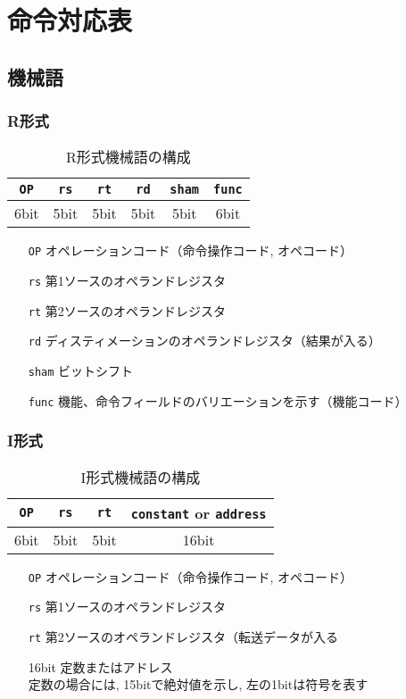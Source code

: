 \documentclass[a4paper, xelatex, ja=standard]{bxjsarticle}
\begin{document}
\maketitle
\section{命令対応表}
\subsection{機械語}
\subsubsection*{R形式}
\begin{table}[h]
  \centering
  \caption{R形式機械語の構成}
  \label{}
  \begin{tabular}{|c|c|c|c|c|c|}\hline
  \texttt{OP} & \texttt{rs} & \texttt{rt} & \texttt{rd} & \texttt{sham} & \texttt{func} \\\hline
  6bit & 5bit & 5bit & 5bit & 5bit & 6bit \\\hline
  \end{tabular}
\end{table}
\begin{enumerate}
  \item[\texttt{OP}]オペレーションコード（命令操作コード, オペコード）
  \item[\texttt{rs}]第1ソースのオペランドレジスタ
  \item[\texttt{rt}]第2ソースのオペランドレジスタ
  \item[\texttt{rd}]ディスティメーションのオペランドレジスタ（結果が入る）
  \item[\texttt{sham}]ビットシフト
  \item[\texttt{func}]機能、命令フィールドのバリエーションを示す（機能コード）
\end{enumerate}

\subsubsection*{I形式}
\begin{table}[h]
  \centering
  \caption{I形式機械語の構成}
  \label{}
  \begin{tabular}{|c|c|c|c|}\hline
  \texttt{OP} & \texttt{rs} & \texttt{rt} & \texttt{constant} or \texttt{address} \\\hline
  6bit & 5bit & 5bit & 16bit \\\hline
  \end{tabular}
\end{table}
\begin{enumerate}
  \item[\texttt{OP}]オペレーションコード（命令操作コード, オペコード）
  \item[\texttt{rs}]第1ソースのオペランドレジスタ
  \item[\texttt{rt}]第2ソースのオペランドレジスタ（転送データが入る
  \item[16bit]定数またはアドレス\\定数の場合には, 15bitで絶対値を示し, 左の1bitは符号を表す
\end{enumerate}
\end{document}

